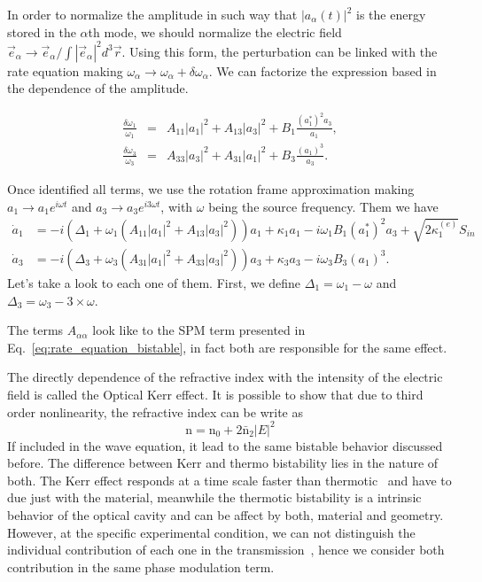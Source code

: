 In order to normalize the amplitude in such way that $|a_\alpha(t)|^2$ is the energy stored in the $\alpha$th mode, we should normalize the electric field $\vec{e}_\alpha \rightarrow\vec{e}_\alpha/\int|\vec{e}_\alpha|^2 d^3\vec{r}$. Using this form, the perturbation can be linked with the rate equation making $\omega_\alpha \rightarrow \omega_\alpha + \delta\omega_\alpha$. We can factorize the expression based in the dependence of the amplitude. 

\begin{eqnarray}
\frac{\delta\omega_1}{\omega_1} &=& A_{11}|a_1|^2 + A_{13}|a_3|^2 + B_1\frac{(a^*_1)^2a_3}{a_1},\label{eq:ir_per}\\
\frac{\delta\omega_3}{\omega_3} &=& A_{33}|a_3|^2 + A_{31}|a_1|^2 + B_3\frac{(a_1)^3}{a_3}\label{eq:vis_per}.
\end{eqnarray}

Once identified all terms, we use the rotation frame approximation making $a_1 \rightarrow a_1e^{i\omega t}$ and $a_3 \rightarrow a_3e^{i3\omega t}$, with $\omega$ being the source frequency. Them we have 
\begin{subequations}
    \begin{alignat}{1}
        \dot{a}_1 &= -i\left(\Delta_1 + \omega_1(A_{11} |a_1|^2 + A_{13} |a_3|^2)\right)a_1 + \kappa_{1}a_1 - i\omega_1 B_1(a^*_1)^2a_3 
        +\sqrt{2 \kappa^{(e)}_1}S_{in}
        \label{eq:taxa_ir_broad}\\
        \dot{a}_3 &= -i\left(\Delta_3 + \omega_3(A_{31} |a_1|^2 + A_{33} |a_3|^2)\right)a_3 + \kappa_{3}a_3 - i\omega_3 B_3(a_1)^3.
        \label{eq:taxa_vis_broad}
    \end{alignat}
    \label{eq:rate_broad}
\end{subequations}
Let's take a look to each one of them. First, we define $\Delta_1 = \omega_1 - \omega$ and $\Delta_3 = \omega_3 - 3\times\omega$. 

The terms $A_{\alpha\alpha}$ look like to the SPM term presented in Eq.~\ref{eq:rate_equation_bistable}, in fact both are responsible for the same effect. 

The directly dependence of the refractive index with the intensity of the electric field is called the Optical Kerr effect. It is possible to show that due to third order nonlinearity, the refractive index can be write as~\cite{Boyd2003}
\begin{equation}
    \text{n} = \text{n}_0 + 2\bar{\text{n}}_2|E|^2 
\end{equation}
If included in the wave equation, it lead to the same bistable behavior discussed before. The difference between Kerr and thermo bistability lies in the nature of both. The Kerr effect responds at a time scale faster than thermotic~\cite{Barclay2007} and have to due just with the material, meanwhile the thermotic bistability is a intrinsic behavior of the optical cavity and can be affect by both, material and geometry. However, at the specific experimental condition, we can not distinguish the individual contribution of each one in the transmission~\cite{Braginsky89}, hence we consider both contribution in the same phase modulation term. 

